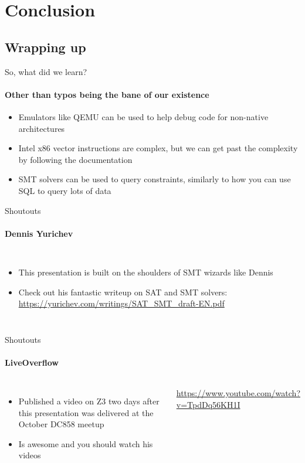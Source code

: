 
\section{Conclusion}

\subsection{Wrapping up}

\begin{frame}{So, what did we learn?}
    \framesubtitle{Other than typos being the bane of our existence}
    \begin{itemize}
        \item<1-> Emulators like QEMU can be used to help debug code for
                  non-native architectures
        \item<2-> Intel x86 vector instructions are complex, but we can get
                  past the complexity by following the documentation
        \item<3-> SMT solvers can be used to query constraints,
                  similarly to how you can use SQL to query lots of data
    \end{itemize}
\end{frame}

\begin{frame}{Shoutouts}
    \framesubtitle{Dennis Yurichev}
    \begin{columns}
        \begin{itemize}
            \item This presentation is built on the shoulders of SMT wizards
                  like Dennis
            \item Check out his fantastic writeup on SAT and SMT solvers: 
                  \url{https://yurichev.com/writings/SAT_SMT_draft-EN.pdf}
        \end{itemize}

    \end{columns}
\end{frame}

\begin{frame}{Shoutouts}
    \framesubtitle{LiveOverflow}
    \begin{columns}
        \begin{itemize}
            \item Published a video on Z3 two days after this presentation was
                  delivered at the October DC858 meetup
            \item Is awesome and you should watch his videos
        \end{itemize}
        \begin{center}
            \url{https://www.youtube.com/watch?v=TpdDq56KH1I}
        \end{center}
    \end{columns}
\end{frame}

